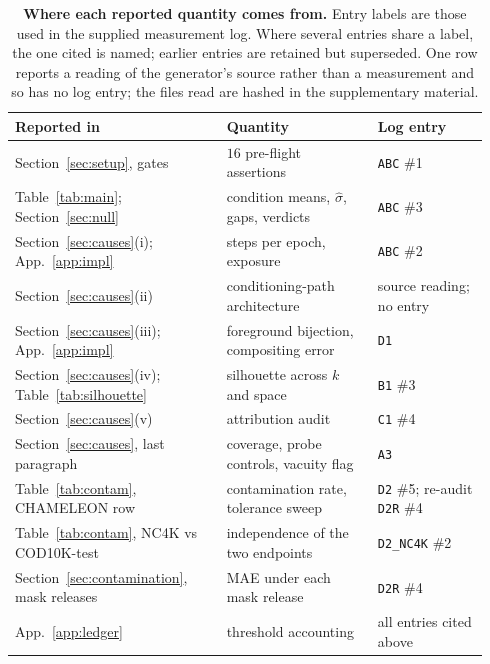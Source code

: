 \documentclass{article}
\begin{document}
\begin{table}[h]
\caption{\textbf{Where each reported quantity comes from.} Entry labels are those
used in the supplied measurement log. Where several entries share a label, the
one cited is named; earlier entries are retained but superseded. One row reports
a reading of the generator's source rather than a measurement and so has no log
entry; the files read are hashed in the supplementary material.}
\label{tab:trace}
\begin{center}
\footnotesize
\begin{tabular}{@{}p{0.42\linewidth}p{0.30\linewidth}p{0.22\linewidth}@{}}
\toprule
Reported in & Quantity & Log entry \\
\midrule
Section~\ref{sec:setup}, gates & $16$ pre-flight assertions & \texttt{ABC} \#1 \\
Table~\ref{tab:main}; Section~\ref{sec:null} & condition means, $\hat{\sigma}$, gaps, verdicts & \texttt{ABC} \#3 \\
Section~\ref{sec:causes}(i); App.~\ref{app:impl} & steps per epoch, exposure & \texttt{ABC} \#2 \\
Section~\ref{sec:causes}(ii) & conditioning-path architecture & source reading; no entry \\
Section~\ref{sec:causes}(iii); App.~\ref{app:impl} & foreground bijection, compositing error & \texttt{D1} \\
Section~\ref{sec:causes}(iv); Table~\ref{tab:silhouette} & silhouette across $k$ and space & \texttt{B1} \#3 \\
Section~\ref{sec:causes}(v) & attribution audit & \texttt{C1} \#4 \\
Section~\ref{sec:causes}, last paragraph & coverage, probe controls, vacuity flag & \texttt{A3} \\
Table~\ref{tab:contam}, CHAMELEON row & contamination rate, tolerance sweep & \texttt{D2} \#5; re-audit \texttt{D2R} \#4 \\
Table~\ref{tab:contam}, NC4K vs COD10K-test & independence of the two endpoints & \texttt{D2\_NC4K} \#2 \\
Section~\ref{sec:contamination}, mask releases & MAE under each mask release & \texttt{D2R} \#4 \\
App.~\ref{app:ledger} & threshold accounting & all entries cited above \\
\bottomrule
\end{tabular}
\end{center}
\end{table}
\end{document}
